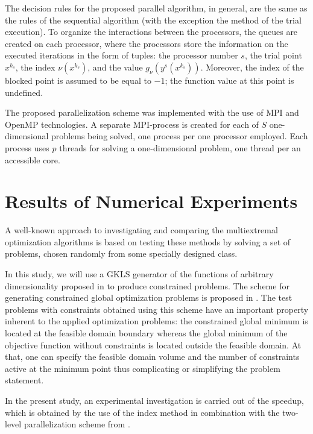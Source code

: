\documentclass{llncs}
\begin{document}
The decision rules for the proposed parallel algorithm, in general, are the same as the rules of the 
sequential algorithm (with the exception the method of the trial execution). To organize the 
interactions between the processors, the queues are created on each processor, where the 
processors store the information on the executed iterations in the form of tuples: the processor 
number $s$, the trial point $x^{k_s}$, the index $\nu(x^{k_s})$, and the value $g_\nu(y^s
(x^{k_s} ) )$. Moreover, the index of the blocked point is assumed to be equal to $-1$; the 
function value at this point is undefined.

The proposed parallelization scheme was implemented with the use of MPI and OpenMP 
technologies. A separate MPI-process is created for each of $S$ one-dimensional problems 
being solved, one process per one processor employed. Each process uses $p$ threads for 
solving a one-dimensional problem, one thread per an accessible core.

\section{Results of Numerical Experiments}
\label{sec:4}

A well-known approach to investigating and comparing the multiextremal optimization 
algorithms is based on testing these methods by solving a set of problems, chosen randomly 
from some specially designed class.

In this study, we will use a GKLS generator of the functions of arbitrary dimensionality 
proposed in \cite{Gaviano2003} to produce constrained problems. The scheme for generating 
constrained global optimization problems is proposed in \cite{Gergel2017}. 
The test problems with constraints obtained using this scheme have an important property 
inherent to the applied optimization problems: the constrained global minimum is located at the 
feasible domain boundary whereas the global minimum of the objective function without 
constraints is located outside the feasible domain. At that, one can specify the feasible domain 
volume and the number of constraints active at the minimum point thus complicating or 
simplifying the problem statement.

In the present study, an experimental investigation is carried out of the speedup, which is 
obtained by the use of the index method in combination with the two-level parallelization 
scheme from \cite{Sidorov2015}.
\end{document}
